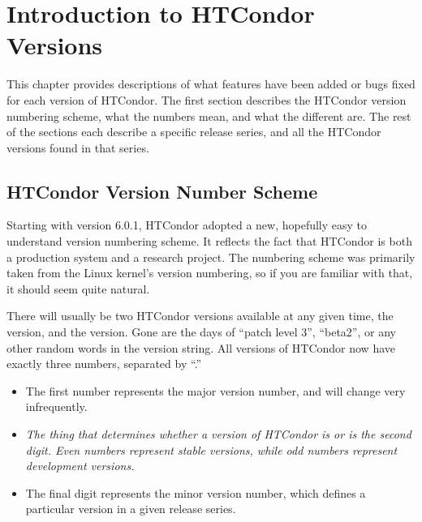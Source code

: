 \section{Introduction to HTCondor Versions}\label{sec:History-Intro}

This chapter provides descriptions of what features have been added or
bugs fixed for each version of HTCondor.
The first section describes the HTCondor version numbering scheme, what
the numbers mean, and what the different  are.
The rest of the sections each describe a specific release series, and
all the HTCondor versions found in that series.

\subsection{\label{sec:Version-Number-Scheme}
HTCondor Version Number Scheme}

Starting with version 6.0.1, HTCondor adopted a new, hopefully easy to
understand version numbering scheme.
It reflects the fact that HTCondor is both a production system and a
research project.
The numbering scheme was primarily taken from the Linux kernel's
version numbering, so if you are familiar with that, it should seem
quite natural.

There will usually be two HTCondor versions available at any given time,
the  version, and the  version.
Gone are the days of ``patch level 3'', ``beta2'', or any other random
words in the version string.
All versions of HTCondor now have exactly three numbers, separated by
``.''   

\begin{itemize}

\item The first number represents the major version number, and will
change very infrequently.

\item \emph{The thing that determines whether a version of HTCondor is
 or  is the second digit.
Even numbers represent stable versions, while odd numbers represent
development versions.}

\item The final digit represents the minor version number, which
defines a particular version in a given release series.

\end{itemize}


